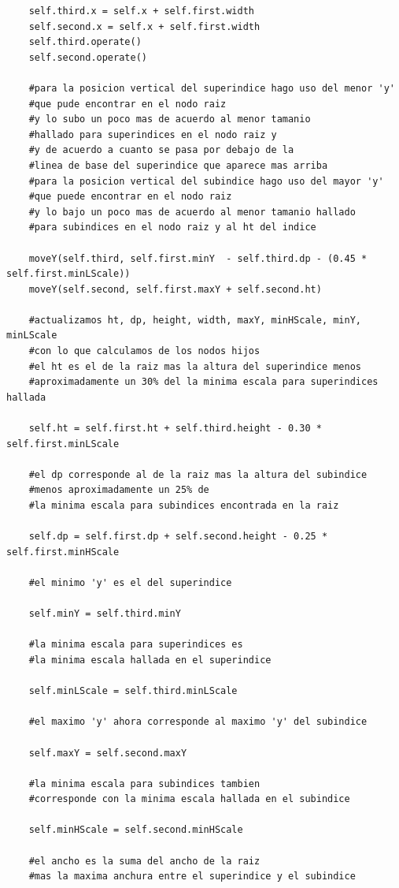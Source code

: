 \begin{verbatim}
    self.third.x = self.x + self.first.width
    self.second.x = self.x + self.first.width
    self.third.operate()
    self.second.operate()

    #para la posicion vertical del superindice hago uso del menor 'y' 
    #que pude encontrar en el nodo raiz
    #y lo subo un poco mas de acuerdo al menor tamanio 
    #hallado para superindices en el nodo raiz y
    #y de acuerdo a cuanto se pasa por debajo de la 
    #linea de base del superindice que aparece mas arriba
    #para la posicion vertical del subindice hago uso del mayor 'y' 
    #que puede encontrar en el nodo raiz
    #y lo bajo un poco mas de acuerdo al menor tamanio hallado 
    #para subindices en el nodo raiz y al ht del indice
    
    moveY(self.third, self.first.minY  - self.third.dp - (0.45 * self.first.minLScale))
    moveY(self.second, self.first.maxY + self.second.ht)

    #actualizamos ht, dp, height, width, maxY, minHScale, minY, minLScale 
    #con lo que calculamos de los nodos hijos
    #el ht es el de la raiz mas la altura del superindice menos
    #aproximadamente un 30% del la minima escala para superindices hallada
    
    self.ht = self.first.ht + self.third.height - 0.30 * self.first.minLScale
    
    #el dp corresponde al de la raiz mas la altura del subindice 
    #menos aproximadamente un 25% de 
    #la minima escala para subindices encontrada en la raiz
    
    self.dp = self.first.dp + self.second.height - 0.25 * self.first.minHScale
    
    #el minimo 'y' es el del superindice
    
    self.minY = self.third.minY
    
    #la minima escala para superindices es 
    #la minima escala hallada en el superindice
    
    self.minLScale = self.third.minLScale
    
    #el maximo 'y' ahora corresponde al maximo 'y' del subindice
    
    self.maxY = self.second.maxY
    
    #la minima escala para subindices tambien 
    #corresponde con la minima escala hallada en el subindice
    
    self.minHScale = self.second.minHScale
    
    #el ancho es la suma del ancho de la raiz 
    #mas la maxima anchura entre el superindice y el subindice


\end{verbatim}
